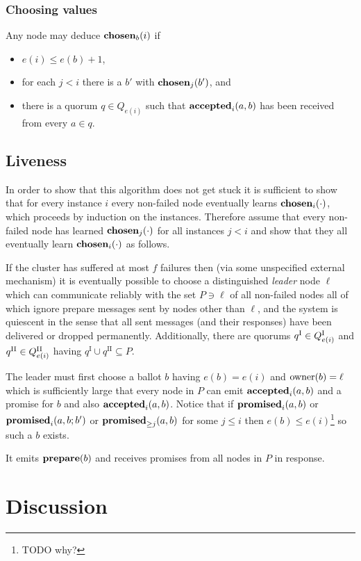 \documentclass[journal]{IEEEtran}
\begin{document}
\subsubsection{Choosing values} Any node may deduce $\mathbf{chosen}_{b}(i)$ if
\begin{itemize} \item $e(i) \le e(b) + 1$, \item for each $j < i$
there is a $b'$ with $\mathbf{chosen}_{j}(b')$, and \item there is a quorum $q \in
Q_{e(i)}$ such that $\mathbf{accepted}_{i}(a,b)$ has been received from every $a \in q$.
\end{itemize}

\pagebreak

\subsection{Liveness}

In order to show that this algorithm does not get stuck it is sufficient to
show that for every instance $i$ every non-failed node eventually learns
$\mathbf{chosen}_{i}(\cdot)$, which proceeds by induction on the instances.  Therefore
assume that every non-failed node has learned $\mathbf{chosen}_{j}(\cdot)$ for all
instances $j<i$ and show that they all eventually learn $\mathbf{chosen}_{i}(\cdot)$ as
follows.

If the cluster has suffered at most $f$ failures then (via some unspecified
external mechanism) it is eventually possible to choose a distinguished
\textit{leader} node $\ell$ which can communicate reliably with the set $P \ni
\ell$ of all non-failed nodes all of which ignore prepare messages sent by
nodes other than $\ell$, and the system is quiescent in the sense that all sent
messages (and their responses) have been delivered or dropped permanently.
Additionally, there are quorums $q^\textrm{I} \in {Q}^\textrm{I}_{e(i)}$ and
$q^\textrm{II} \in {Q}^\textrm{II}_{e(i)}$ having $q^\textrm{I} \cup
q^\textrm{II} \subseteq P$.

The leader must first choose a ballot $b$ having $e(b) = e(i)$ and $\mathrm{owner}(b) =
\ell$ which is sufficiently large that every node in $P$ can emit
$\mathbf{accepted}_{i}(a,b)$ and a promise for $b$ and also $\mathbf{accepted}_{i}(a,b)$. Notice that if
$\mathbf{promised}_{i}(a,b)$ or $\mathbf{promised}_{i}(a,b;b')$ or $\mathbf{promised}_{\ge j}(a,b)$ for some $j \le
i$ then $e(b) \le e(i)$\footnote{TODO why?} so such a $b$ exists.

It emits $\mathbf{prepare}(b)$ and receives promises from all nodes in $P$ in response.

\section{Discussion}\label{discussion}
\end{document}
